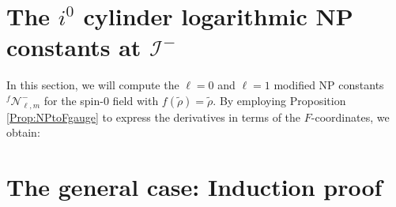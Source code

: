 \section{The $i^0$ cylinder logarithmic NP constants at $\mathscr{I}^{-}$}
\label{sec:LogarithmicNPminus}

In this section, we will compute the $\ell=0$ and $\ell=1$ modified NP constants ${}^{f}\mathcal{N}^{-}_{\ell,m}$ for the spin-0 field with $f(\tilde{\rho})=\tilde{\rho}$. By employing Proposition \ref{Prop:NPtoFgauge} to express the derivatives in terms of the $F$-coordinates, we obtain:

\section{The general case: Induction proof}
\label{sec:induction_argument}

